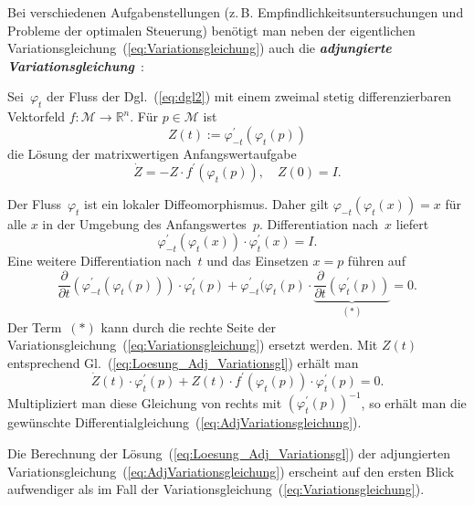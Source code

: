 Bei verschiedenen Aufgabenstellungen (z.\,B. Empfindlichkeitsuntersuchungen
und Probleme der optimalen Steuerung) benötigt man neben der eigentlichen
Variationsgleichung~(\ref{eq:Variationsgleichung}) auch die \textbf{\em adjungierte
Variationsgleichung}~\cite[Lemma~{4.4.4}]{sontag98}:
\begin{proposition}
\label{pro:Adjungierte-Variationsgleichung}Sei~$\varphi_{t}$
der Fluss der Dgl.~(\ref{eq:dgl2}) mit einem zweimal stetig differenzierbaren
Vektorfeld $f:\mathcal{M}\to{\mathbb{R}}^{n}$. Für $p\in\mathcal{M}$ ist
\begin{equation}
Z(t):=\varphi_{-t}^{\prime}(\varphi_{t}(p))\label{eq:Loesung_Adj_Variationsgl}
\end{equation}
 die Lösung der matrixwertigen Anfangswertaufgabe
\begin{equation}
\dot{Z}=-Z\cdot f^{\prime}(\varphi_{t}(p)),\quad Z(0)=I.\label{eq:AdjVariationsgleichung}
\end{equation}
\end{proposition}
\begin{svmultproof}
Der Fluss~$\varphi_{t}$ ist ein lokaler Diffeomorphismus. Daher
gilt $\varphi_{-t}(\varphi_{t}(x))=x$ für alle $x$ in der Umgebung
des Anfangswertes~$p$. Differentiation nach~$x$ liefert
\begin{equation}
\varphi_{-t}^{\prime}(\varphi_{t}(x))\cdot\varphi_{t}^{\prime}(x)=I.\label{eq:Produkt_Variationsgln}
\end{equation}
Eine weitere Differentiation nach~$t$ und das Einsetzen $x=p$ führen
auf
\[
\frac{\partial}{\partial t}\left(\varphi_{-t}^{\prime}(\varphi_{t}(p))\right)\cdot\varphi_{t}^{\prime}(p)+\varphi_{-t}^{\prime}(\varphi_{t}(p)\cdot\underbrace{\frac{\partial}{\partial t}\left(\varphi_{t}^{\prime}(p)\right)}_{{\displaystyle (*)}}=0.
\]
Der Term~$(*)$ kann durch die rechte Seite der Variationsgleichung~(\ref{eq:Variationsgleichung})
ersetzt werden. Mit $Z(t)$ entsprechend Gl.~(\ref{eq:Loesung_Adj_Variationsgl})
erhält man
\[
\dot{Z}(t)\cdot\varphi_{t}^{\prime}(p)+Z(t)\cdot f^{\prime}(\varphi_{t}(p))\cdot\varphi_{t}^{\prime}(p)=0.
\]
Multipliziert man diese Gleichung von rechts mit $(\varphi_{t}^{\prime}(p))^{-1}$,
so erhält man die gewünschte Differentialgleichung~(\ref{eq:AdjVariationsgleichung}).
\end{svmultproof}
Die Berechnung der Lösung~(\ref{eq:Loesung_Adj_Variationsgl}) der
adjungierten Variationsgleichung~(\ref{eq:AdjVariationsgleichung})
erscheint auf den ersten Blick aufwendiger als im Fall der Variationsgleichung~(\ref{eq:Variationsgleichung}).
